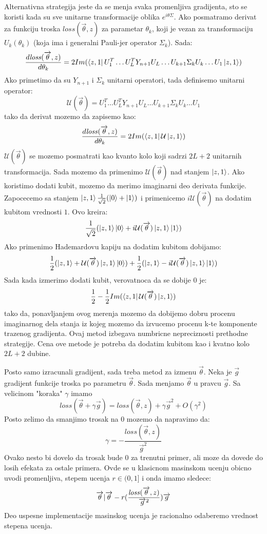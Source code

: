 \documentclass[12pt, letterpaper, oneside]{article}
\begin{document}
Alternativna strategija jeste da se menja svaka promenljiva gradijenta, sto se koristi kada su sve unitarne transformacije oblika $e^{i\theta\Sigma}$.
Ako posmatramo derivat za funkciju troska $\mathit{loss}(\overrightarrow{\theta},z)$ za parametar $\theta_k$, koji je vezan za transformaciju $U_k(\theta_k)$
(koja ima i generalni Pauli-jer operator $\Sigma_k$). Sada:
\[
    \frac{d\mathit{loss}(\overrightarrow{\theta},z)}{d\theta_k} = 2Im(\Bra{z,1}U_1^T \dots U_L^TY_{n+1}U_L \dots U_{k+1} \Sigma_k U_k \dots U_1 \Ket{z,1})
\]
Ako primetimo da su $Y_{n+1}$ i $\Sigma_k$ unitarni operatori, tada definisemo unitarni operator:
\[
    \mathcal{U}(\overrightarrow{\theta}) = U_1^T \dots U_L^TY_{n+1}U_L \dots U_{k+1} \Sigma_k U_k \dots U_1
\]
tako da derivat mozemo da zapisemo kao:
\[
    \frac{d\mathit{loss}(\overrightarrow{\theta},z)}{d\theta_k} = 2Im(\Bra{z,1}\mathcal{U}\Ket{z,1})
\]
$\mathcal{U}(\overrightarrow{\theta})$ se mozemo posmatrati kao kvanto kolo koji sadrzi $2L+2$ unitarnih transformacija.
Sada mozemo da primenimo $\mathcal{U}(\overrightarrow{\theta})$ nad stanjem $\Ket{z,1}$. Ako koristimo dodati kubit, mozemo da merimo imaginarni deo
derivata funkcije. Zapocecemo sa stanjem $\Ket{z,1}\frac{1}{\sqrt{2}}(\Ket{0}+\Ket{1})$ i primenicemo $i\mathcal{U}(\overrightarrow{\theta})$ na dodatim kubitom vrednosti $1$.
Ovo kreira:
\[
    \frac{1}{\sqrt{2}}(\Ket{z,1}\Ket{0} + i\mathcal{U}(\overrightarrow{\theta})\Ket{z,1}\Ket{1})
\]
Ako primenimo Hademardovu kapiju na dodatim kubitom dobijamo:
\[
    \frac{1}{2}(\Ket{z,1}+\mathcal{U}(\overrightarrow{\theta})\Ket{z,1}\Ket{0}) + \frac{1}{2}(\Ket{z,1}-i\mathcal{U}(\overrightarrow{\theta})\Ket{z,1}\Ket{1})
\]
Sada kada izmerimo dodati kubit, verovatnoca da se dobije $0$ je:
\[
    \frac{1}{2} - \frac{1}{2}Im(\bra{z,1}\mathcal{U}(\overrightarrow{\theta})\Ket{z,1})
\]
tako da, ponavljanjem ovog merenja mozemo da dobijemo dobru procenu imaginarnog dela stanja iz kojeg mozemo da izvucemo procenu k-te komponente trazenog gradijenta.
Ovaj metod izbegava numbricne nepreciznosti prethodne strategije. Cena ove metode je potreba da dodatim kubitom kao i kvatno kolo $2L+2$ dubine.

Posto samo izracunali gradijent, sada treba metod za izmenu $\overrightarrow{\theta}$. Neka je $\overrightarrow{g}$ gradijent funkcije troska po parametru $\overrightarrow{\theta}$.
Sada menjamo $\overrightarrow{\theta}$ u pravcu $\overrightarrow{g}$. Sa velicinom "koraka" $\gamma$ imamo
\[
    \mathit{loss}(\overrightarrow{\theta}+\gamma \overrightarrow{g}) = \mathit{loss}(\overrightarrow{\theta},z)+ \gamma \overrightarrow{g}^2 + O(\gamma^2)
\]
Posto zelimo da smanjimo trosak na $0$ mozemo da napravimo da:
\[
    \gamma = -\frac{\mathit{loss}(\overrightarrow{\theta},z)}{\overrightarrow{g}^2}
\]
Ovako nesto bi dovelo da trosak bude $0$ za trenutni primer, ali moze da dovede do losih efekata za ostale primera. 
Ovde se u klasicnom masinskom ucenju obicno uvodi promenljiva, stepem ucenja $r \in (0,1]$ i onda imamo sledece:
\[
    \overrightarrow{\theta} \arrowvert \overrightarrow{\theta} - r(\frac{\mathit{loss}(\overrightarrow{\theta},z)}{\overrightarrow{g}^2})\overrightarrow{g}
\]
Deo uspesne implementacije masinskog ucenja je racionalno odaberemo vrednost stepena ucenja.
\end{document}
